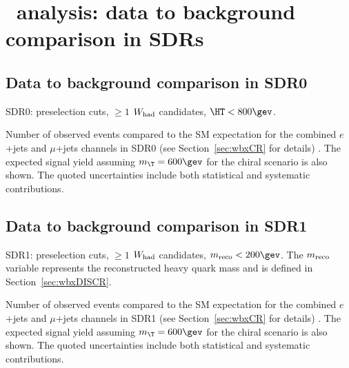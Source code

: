 \clearpage{\pagestyle{empty}\cleardoublepage}

\chapter{\wbx\ analysis: data to background comparison in SDRs}\label{app:wbxSDRs}

\section{Data to background comparison in SDR0}
\label{sec:DataMC_CR0}

SDR0: preselection cuts, $\geq 1$ $W_{\rm had}$ candidates, $\HT<800\gev$. 

\begin{table}[h!]
\begin{center}

\caption{\small{Number of observed events compared to the SM expectation for
the combined $e$+jets and $\mu$+jets channels in SDR0 (see Section~\ref{sec:wbxCR} for details) . 
The expected signal yield assuming $m_{\T}=600\gev$ for the chiral scenario is also shown. 
The quoted uncertainties include both statistical and systematic contributions.}}
\label{tab:CR0_1W_evtable}
\end{center}
\end{table}

\clearpage
%


\clearpage

\section{Data to background comparison in SDR1}
\label{sec:DataMC_CR5}

SDR1: preselection cuts, $\geq 1$ $W_{\rm had}$ candidates, $m_{\rm reco}<200\gev$. The $m_{\rm reco}$ variable represents the
reconstructed heavy quark mass and is defined in Section~\ref{sec:wbxDISCR}. 

\begin{table}[h!]
\begin{center}

\caption{\small{Number of observed events compared to the SM expectation for
the combined $e$+jets and $\mu$+jets channels in SDR1 (see Section~\ref{sec:wbxCR} for details) . 
The expected signal yield assuming $m_{\T}=600\gev$ for the chiral scenario is also shown. 
The quoted uncertainties include both statistical and systematic contributions.}}
\label{tab:CR5_1W_evtable}
\end{center}
\end{table}

